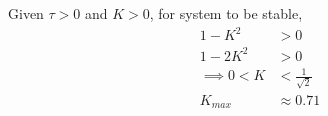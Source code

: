 \documentclass[journal,12pt,twocolumn]{IEEEtran}
\theoremstyle{remark}
\begin{document}
\begin{table}[htbp]
\setlength{\extrarowheight}{8pt}
\centering

\caption{}
\label{tab:inputs.IN.24.2023}
\end{table}


Given $\tau>0$ and $K>0$, for system to be stable,
\begin{align}
1-K^2&> 0\\
1-2K^2&> 0\\
\implies 0 < K&< \frac{1}{\sqrt{2}}\\
K_{max} &\approx 0.71
\end{align}
\end{document}
